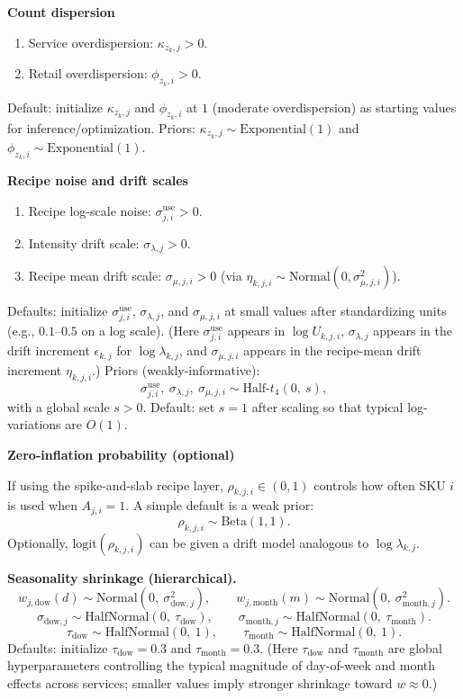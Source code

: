 \documentclass[11pt]{article}
\begin{document}
\textbf{Count dispersion}
\begin{enumerate}
  \item Service overdispersion: $\kappa_{z_k,j} > 0$.
  \item Retail overdispersion: $\phi_{z_k,i} > 0$.
\end{enumerate}
Default: initialize $\kappa_{z_k,j}$ and $\phi_{z_k,i}$ at $1$ (moderate overdispersion) as starting values for inference/optimization.
Priors: $\kappa_{z_k,j} \sim \text{Exponential}(1)$ and $\phi_{z_k,i} \sim \text{Exponential}(1)$.

\textbf{Recipe noise and drift scales}
\begin{enumerate}
  \item Recipe log-scale noise: $\sigma^{\mathrm{use}}_{j,i} > 0$.
  \item Intensity drift scale: $\sigma_{\lambda,j} > 0$.
  \item Recipe mean drift scale: $\sigma_{\mu,j,i} > 0$ (via $\eta_{k,j,i}\sim\text{Normal}(0,\sigma^2_{\mu,j,i})$).
\end{enumerate}
Defaults: initialize $\sigma^{\mathrm{use}}_{j,i}$, $\sigma_{\lambda,j}$, and $\sigma_{\mu,j,i}$ at small values after standardizing units (e.g., $0.1$--$0.5$ on a log scale).
(Here $\sigma^{\mathrm{use}}_{j,i}$ appears in $\log U_{k,j,i}$, $\sigma_{\lambda,j}$ appears in the drift increment $\epsilon_{k,j}$ for $\log\lambda_{k,j}$, and $\sigma_{\mu,j,i}$ appears in the recipe-mean drift increment $\eta_{k,j,i}$.)
Priors (weakly-informative):
\[
  \sigma^{\mathrm{use}}_{j,i},\ \sigma_{\lambda,j},\ \sigma_{\mu,j,i} \sim \text{Half-}t_{4}(0,\ s),
\]
with a global scale $s>0$.
Default: set $s=1$ after scaling so that typical log-variations are $O(1)$.

\textbf{Zero-inflation probability (optional)}

If using the spike-and-slab recipe layer, $\rho_{k,j,i} \in (0,1)$ controls how often SKU $i$ is used when $A_{j,i}=1$.
A simple default is a weak prior:
\[
  \rho_{k,j,i} \sim \text{Beta}(1,1).
\]
Optionally, $\text{logit}(\rho_{k,j,i})$ can be given a drift model analogous to $\log \lambda_{k,j}$.

\textbf{Seasonality shrinkage (hierarchical).}
\[
  w_{j,\text{dow}}(d) \sim \text{Normal}(0,\ \sigma^2_{\text{dow},j}),\qquad
  w_{j,\text{month}}(m) \sim \text{Normal}(0,\ \sigma^2_{\text{month},j}).
\]
\[
  \sigma_{\text{dow},j} \sim \text{HalfNormal}(0,\ \tau_{\text{dow}}),\qquad
  \sigma_{\text{month},j} \sim \text{HalfNormal}(0,\ \tau_{\text{month}}).
\]
\[
  \tau_{\text{dow}} \sim \text{HalfNormal}(0,\ 1),\qquad
  \tau_{\text{month}} \sim \text{HalfNormal}(0,\ 1).
\]
Defaults: initialize $\tau_{\text{dow}}=0.3$ and $\tau_{\text{month}}=0.3$.
(Here $\tau_{\text{dow}}$ and $\tau_{\text{month}}$ are global hyperparameters controlling the typical magnitude of day-of-week and month effects across services; smaller values imply stronger shrinkage toward $w\approx 0$.)
\end{document}
